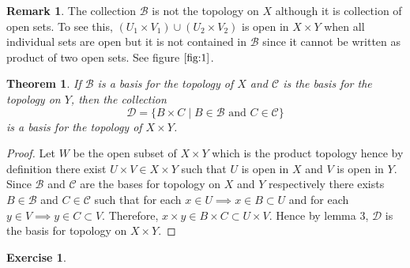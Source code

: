 \documentclass[12pt,reqno]{amsart}
\theoremstyle{plain}
\newtheorem{thm}{Theorem}
\theoremstyle{definition}
\newtheorem{exer}{Exercise}
\newtheorem{rem}{Remark}
\newcommand{\cal}[1]{\mathcal{#1}}
\begin{document}
\begin{rem}
    The collection $\cal B$ is not the topology on $X$ although it is collection of open sets. To see this, $(U_1 \times V_1) \cup (U_2 \times V_2)$ is open in $X \times Y$ when all individual sets are open but it is not contained in $\cal B$ since it cannot be written as product of two open sets. See figure $\ref{fig:1}$.
    \begin{figure}[!ht]
        \caption{}
        \label{fig:1}
    \end{figure}
\end{rem}

\begin{thm}
    If $\cal B$ is a basis for the topology of $X$ and $\cal C$ is the basis for the topology on $Y$, then the collection
    $$ \cal D = \{B \times C \mid B \in \cal B \text{ and } C \in \cal C\} $$ 
    is a basis for the topology of $X \times Y$.
\end{thm}
\begin{proof}
    Let $W$ be the open subset of $X \times Y$ which is the product topology hence by definition there exist $U \times V \in X \times Y$ such that $U$ is open in $X$ and $V$ is open in $Y$. Since $\cal B$ and $\cal C$ are the bases for topology on $X$ and $Y$ respectively there exists $B \in \cal B$ and $C \in \cal C$ such that for each $x \in U \implies x \in B \subset U$ and for each $y \in V \implies y \in C \subset V$. Therefore, $x \times y \in B \times C \subset U \times V$. Hence by lemma $3$, $\cal D$ is the basis for topology on $X \times Y$.    
\end{proof}

\begin{exer}
        
\end{exer}
\end{document}
